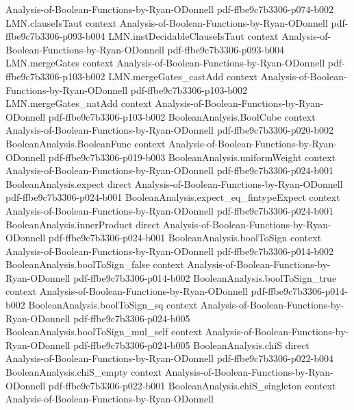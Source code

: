 \begin{theorem}
  {Analysis-of-Boolean-Functions-by-Ryan-ODonnell}
  {pdf-ffbe9c7b3306-p074-b002}
\proofstep
  {LMN.clauseIsTaut}
  {context}
  {Analysis-of-Boolean-Functions-by-Ryan-ODonnell}
  {pdf-ffbe9c7b3306-p093-b004}
\proofstep
  {LMN.instDecidableClauseIsTaut}
  {context}
  {Analysis-of-Boolean-Functions-by-Ryan-ODonnell}
  {pdf-ffbe9c7b3306-p093-b004}
\proofstep
  {LMN.mergeGates}
  {context}
  {Analysis-of-Boolean-Functions-by-Ryan-ODonnell}
  {pdf-ffbe9c7b3306-p103-b002}
\proofstep
  {LMN.mergeGates_castAdd}
  {context}
  {Analysis-of-Boolean-Functions-by-Ryan-ODonnell}
  {pdf-ffbe9c7b3306-p103-b002}
\proofstep
  {LMN.mergeGates_natAdd}
  {context}
  {Analysis-of-Boolean-Functions-by-Ryan-ODonnell}
  {pdf-ffbe9c7b3306-p103-b002}
\proofstep
  {BooleanAnalysis.BoolCube}
  {context}
  {Analysis-of-Boolean-Functions-by-Ryan-ODonnell}
  {pdf-ffbe9c7b3306-p020-b002}
\proofstep
  {BooleanAnalysis.BooleanFunc}
  {context}
  {Analysis-of-Boolean-Functions-by-Ryan-ODonnell}
  {pdf-ffbe9c7b3306-p019-b003}
\proofstep
  {BooleanAnalysis.uniformWeight}
  {context}
  {Analysis-of-Boolean-Functions-by-Ryan-ODonnell}
  {pdf-ffbe9c7b3306-p024-b001}
\proofstep
  {BooleanAnalysis.expect}
  {direct}
  {Analysis-of-Boolean-Functions-by-Ryan-ODonnell}
  {pdf-ffbe9c7b3306-p024-b001}
\proofstep
  {BooleanAnalysis.expect_eq_fintypeExpect}
  {context}
  {Analysis-of-Boolean-Functions-by-Ryan-ODonnell}
  {pdf-ffbe9c7b3306-p024-b001}
\proofstep
  {BooleanAnalysis.innerProduct}
  {direct}
  {Analysis-of-Boolean-Functions-by-Ryan-ODonnell}
  {pdf-ffbe9c7b3306-p024-b001}
\proofstep
  {BooleanAnalysis.boolToSign}
  {context}
  {Analysis-of-Boolean-Functions-by-Ryan-ODonnell}
  {pdf-ffbe9c7b3306-p014-b002}
\proofstep
  {BooleanAnalysis.boolToSign_false}
  {context}
  {Analysis-of-Boolean-Functions-by-Ryan-ODonnell}
  {pdf-ffbe9c7b3306-p014-b002}
\proofstep
  {BooleanAnalysis.boolToSign_true}
  {context}
  {Analysis-of-Boolean-Functions-by-Ryan-ODonnell}
  {pdf-ffbe9c7b3306-p014-b002}
\proofstep
  {BooleanAnalysis.boolToSign_sq}
  {context}
  {Analysis-of-Boolean-Functions-by-Ryan-ODonnell}
  {pdf-ffbe9c7b3306-p024-b005}
\proofstep
  {BooleanAnalysis.boolToSign_mul_self}
  {context}
  {Analysis-of-Boolean-Functions-by-Ryan-ODonnell}
  {pdf-ffbe9c7b3306-p024-b005}
\proofstep
  {BooleanAnalysis.chiS}
  {direct}
  {Analysis-of-Boolean-Functions-by-Ryan-ODonnell}
  {pdf-ffbe9c7b3306-p022-b004}
\proofstep
  {BooleanAnalysis.chiS_empty}
  {context}
  {Analysis-of-Boolean-Functions-by-Ryan-ODonnell}
  {pdf-ffbe9c7b3306-p022-b001}
\proofstep
  {BooleanAnalysis.chiS_singleton}
  {context}
  {Analysis-of-Boolean-Functions-by-Ryan-ODonnell}

\end{theorem}
